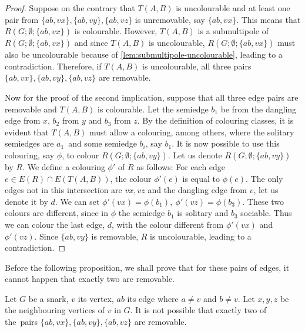 \begin{proof}
	Suppose on the contrary that $T(A,B)$ is uncolourable and at least one pair from $\{ab,vx\}, \{ab,vy\}, \{ab,vz\}$ is unremovable, say $\{ab,vx\}$. This means that $R(G;\emptyset;\{ab,vx\})$ is colourable. However, $T(A,B)$ is a submultipole of $R(G;\emptyset;\{ab,vx\})$ and since $T(A,B)$ is uncolourable, $R(G;\emptyset;\{ab,vx\})$ must also be uncolourable because of \cref{lem:submultipole-uncolourable}, leading to a contradiction. Therefore, if $T(A,B)$ is uncolourable, all three pairs $\{ab,vx\}, \{ab,vy\}, \{ab,vz\}$ are removable.
	
	Now for the proof of the second implication, suppose that all three edge pairs are removable and $T(A,B)$ is colourable. Let the semiedge $b_1$ be from the dangling edge from $x$, $b_2$ from $y$ and $b_3$ from $z$. By the definition of colouring classes, it is evident that $T(A,B)$ must allow a colouring, among others, where the solitary semiedges are $a_1$~and some semiedge $b_i$, say $b_1$. It is now possible to use this colouring, say $\phi$, to colour $R(G;\emptyset;\{ab,vy\})$. Let us denote $R(G;\emptyset;\{ab,vy\})$ by $R$.
	We define a colouring $\phi'$ of $R$ as follows: For each edge $e\in E(R)\cap E(T(A,B))$, the colour $\phi'(e)$ is equal to $\phi(e)$. The only edges not in this intersection are $vx,vz$ and the dangling edge from $v$, let us denote it by $d$. We can set $\phi'(vx)=\phi(b_1),~\phi'(vz)=\phi(b_3)$. These two colours are different, since in $\phi$ the semiedge $b_1$ is solitary and $b_3$ sociable. Thus we can colour the last edge, $d$, with the colour different from $\phi'(vx)$ and $\phi'(vz)$. Since $\{ab,vy\}$ is removable, $R$ is uncolourable, leading to a contradiction.
\end{proof}

Before the following proposition, we shall prove that for these pairs of edges, it cannot happen that exactly two are removable.

\begin{lemma}
	Let $G$ be a snark, $v$ its vertex, $ab$ its edge where $a\neq v$ and $b \neq v$. Let $x,y,z$ be the neighbouring vertices of $v$ in $G$. It is not possible that exactly two of the~pairs $\{ab,vx\}, \{ab,vy\}, \{ab,vz\}$ are removable.
	\label{lem:not-2-removable}
\end{lemma}

